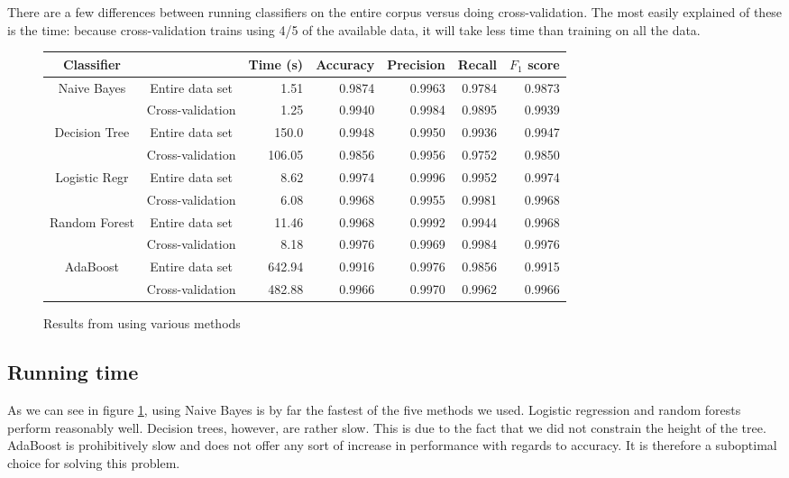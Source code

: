 \documentclass{article} %
\begin{document}
There are a few differences between running classifiers on the entire corpus versus doing cross-validation. The most easily explained of these is the time: because cross-validation trains using 4/5 of the available data, it will take less time than training on all the data. 

\begin{figure}[h]
  \begin{tabular}[h]{ | c | c | r | r | r | r | r | }
    \hline
    Classifier    &                  & Time (s) & Accuracy & Precision & Recall & $F_1$ score  \\ \hline
    Naive Bayes   & Entire data set  & 1.51     & 0.9874   & 0.9963    & 0.9784 & 0.9873 \\ \cline{2-7}
                  & Cross-validation & 1.25     & 0.9940   & 0.9984    & 0.9895 & 0.9939 \\ \hline
    Decision Tree & Entire data set  & 150.0    & 0.9948   & 0.9950    & 0.9936 & 0.9947 \\ \cline{2-7}
                  & Cross-validation & 106.05   & 0.9856   & 0.9956    & 0.9752 & 0.9850 \\ \hline
    Logistic Regr & Entire data set  & 8.62     & 0.9974   & 0.9996    & 0.9952 & 0.9974 \\ \cline{2-7}
                  & Cross-validation & 6.08     & 0.9968   & 0.9955    & 0.9981 & 0.9968 \\ \hline
    Random Forest & Entire data set  & 11.46    & 0.9968   & 0.9992    & 0.9944 & 0.9968 \\ \cline{2-7}
                  & Cross-validation & 8.18     & 0.9976   & 0.9969    & 0.9984 & 0.9976 \\ \hline
    AdaBoost      & Entire data set  & 642.94   & 0.9916   & 0.9976    & 0.9856 & 0.9915 \\ \cline{2-7}
                  & Cross-validation & 482.88   & 0.9966   & 0.9970    & 0.9962 & 0.9966 \\ \hline
  \end{tabular}
  \caption{Results from using various methods}
  \label{fig:table}
\end{figure}

\subsection{Running time}
As we can see in figure \ref{fig:table}, using Naive Bayes is by far the fastest of the five methods we used. Logistic regression and random forests perform reasonably well. Decision trees, however, are rather slow. This is due to the fact that we did not constrain the height of the tree. AdaBoost is prohibitively slow and does not offer any sort of increase in performance with regards to accuracy. It is therefore a suboptimal choice for solving this problem. 
\end{document}
